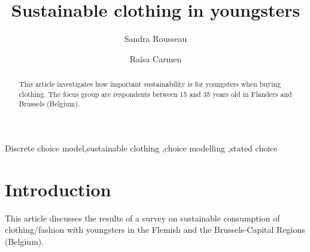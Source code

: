 \documentclass[review]{elsarticle}
\begin{document}
\begin{frontmatter}

\title{Sustainable clothing in youngsters }

\author[]{Sandra Rousseau}
\author[mymainaddress]{Ra\"{i}sa Carmen}




\address[mymainaddress]{CEDON, KU Leuven}

\begin{abstract}
This article investigates how important sustainability is for youngsters when buying clothing. The focus group are respondents between 15 and 35 years old in Flanders and Brussels (Belgium).
\end{abstract}

\begin{keyword}
Discrete choice model\sep sustainable clothing \sep choice modelling \sep stated choice
\end{keyword}

\end{frontmatter}

\linenumbers

\section{Introduction}\label{sec:Intro}
This article discusses the results of a survey on sustainable consumption of clothing/fashion with youngsters in the Flemish and the Brussels-Capital Regions (Belgium).
\end{document}
